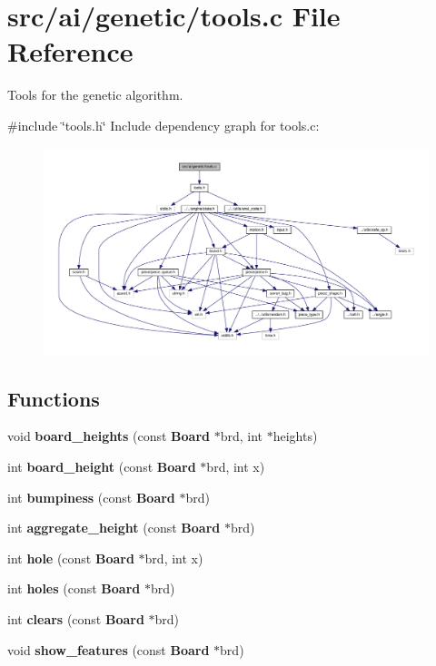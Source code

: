 \section{src/ai/genetic/tools.c File Reference}
\label{tools_8c}


Tools for the genetic algorithm.  


{\ttfamily \#include \char`\"{}tools.\+h\char`\"{}}\newline
Include dependency graph for tools.\+c\+:
\nopagebreak
\begin{figure}[H]
\begin{center}
\leavevmode
\includegraphics[width=350pt]{tools_8c__incl}
\end{center}
\end{figure}
\subsection*{Functions}
\begin{DoxyCompactItemize}
\item 
void \textbf{ board\+\_\+heights} (const \textbf{ Board} $\ast$brd, int $\ast$heights)
\item 
int \textbf{ board\+\_\+height} (const \textbf{ Board} $\ast$brd, int x)
\item 
int \textbf{ bumpiness} (const \textbf{ Board} $\ast$brd)
\item 
int \textbf{ aggregate\+\_\+height} (const \textbf{ Board} $\ast$brd)
\item 
int \textbf{ hole} (const \textbf{ Board} $\ast$brd, int x)
\item 
int \textbf{ holes} (const \textbf{ Board} $\ast$brd)
\item 
int \textbf{ clears} (const \textbf{ Board} $\ast$brd)
\item 
void \textbf{ show\+\_\+features} (const \textbf{ Board} $\ast$brd)
\end{DoxyCompactItemize}


